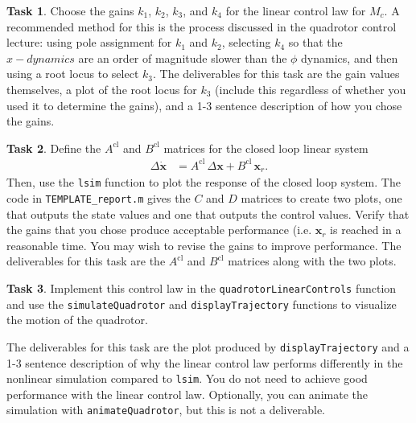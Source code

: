 \documentclass{article}
\theoremstyle{definition}
\newtheorem{task}{Task}
\begin{document}
\begin{task}
    Choose the gains $k_1$, $k_2$, $k_3$, and $k_4$ for the linear control law for $M_c$. A recommended method for this is the process discussed in the quadrotor control lecture: using pole assignment for $k_1$ and $k_2$, selecting $k_4$ so that the $x-dynamics$ are an order of magnitude slower than the $\phi$ dynamics, and then using a root locus to select $k_3$. The deliverables for this task are the gain values themselves, a plot of the root locus for $k_3$ (include this regardless of whether you used it to determine the gains), and a 1-3 sentence description of how you chose the gains.
\end{task}

\begin{task}
    Define the $A^\text{cl}$ and $B^\text{cl}$ matrices for the closed loop linear system
    \begin{align*}
        \Delta \dot{\mathbf{x}} &= A^\text{cl} \, \Delta \mathbf{x} + B^\text{cl} \, \mathbf{x}_r \text{.}
    \end{align*}
    Then, use the \texttt{lsim} function to plot the response of the closed loop system. The code in \texttt{TEMPLATE\_report.m} gives the $C$ and $D$ matrices to create two plots, one that outputs the state values and one that outputs the control values. Verify that the gains that you chose produce acceptable performance (i.e. $\textbf{x}_r$ is reached in a reasonable time. You may wish to revise the gains to improve performance.
    The deliverables for this task are the $A^\text{cl}$ and $B^\text{cl}$ matrices along with the two plots.
\end{task}

\begin{task}
    Implement this control law in the \texttt{quadrotorLinearControls} function and use the \texttt{simulateQuadrotor} and \texttt{displayTrajectory} functions to visualize the motion of the quadrotor.

    The deliverables for this task are the plot produced by \texttt{displayTrajectory} and a 1-3 sentence description of why the linear control law performs differently in the nonlinear simulation compared to \texttt{lsim}. You do not need to achieve good performance with the linear control law.
Optionally, you can animate the simulation with \texttt{animateQuadrotor}, but this is not a deliverable.
\end{task}
\end{document}
